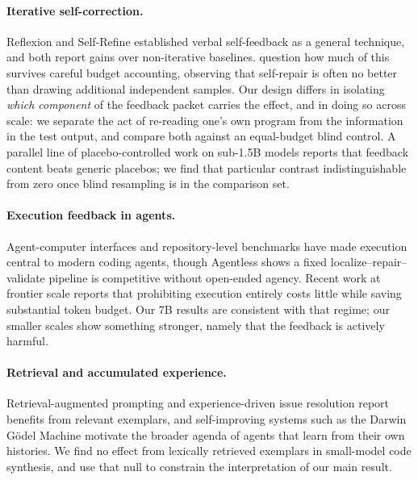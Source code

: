 \paragraph{Iterative self-correction.}
Reflexion \cite{shinn2023reflexion} and Self-Refine
\cite{madaan2023selfrefine} established verbal self-feedback as a general
technique, and both report gains over non-iterative baselines.
\citet{olausson2023selfrepair} question how much of this survives careful
budget accounting, observing that self-repair is often no better than drawing
additional independent samples. Our design differs in isolating \emph{which
component} of the feedback packet carries the effect, and in doing so across
scale: we separate the act of re-reading one's own program from the
information in the test output, and compare both against an equal-budget blind
control. A parallel line of placebo-controlled work on sub-1.5B models reports
that feedback content beats generic placebos; we find that particular contrast
indistinguishable from zero once blind resampling is in the comparison set.

\paragraph{Execution feedback in agents.}
Agent-computer interfaces \cite{yang2024sweagent} and repository-level
benchmarks \cite{jimenez2024swebench} have made execution central to modern
coding agents, though Agentless \cite{xia2024agentless} shows a fixed
localize--repair--validate pipeline is competitive without open-ended agency.
Recent work at frontier scale reports that prohibiting execution entirely costs
little while saving substantial token budget. Our 7B results are consistent
with that regime; our smaller scales show something stronger, namely that the
feedback is actively harmful.

\paragraph{Retrieval and accumulated experience.}
Retrieval-augmented prompting \cite{liu2024rag4code} and experience-driven
issue resolution \cite{zhang2024codagentexp} report benefits from relevant
exemplars, and self-improving systems such as the Darwin G\"odel Machine
\cite{zhang2025dgm} motivate the broader agenda of agents that learn from their
own histories. We find no effect from lexically retrieved exemplars in
small-model code synthesis, and use that null to constrain the interpretation
of our main result.

